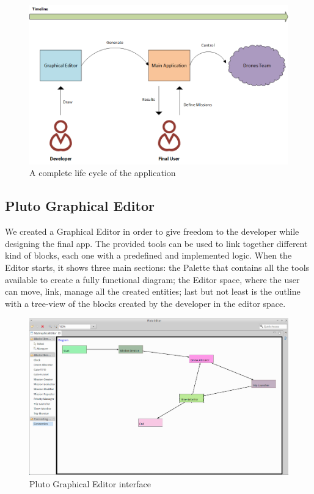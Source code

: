 \begin{figure}[htb]
  \centering
  \includegraphics[width=\linewidth]{pictures/lifeCycle.png}
  \caption{A complete life cycle of the application}
  \label{fig:lifeCycle}
\end{figure}

\subsection{Pluto Graphical Editor}
\label{plutoGraphicalEditor}

We created a Graphical Editor in order to give freedom to the developer while designing the final app. The provided tools can be used to link together different kind of blocks, each one with a predefined and implemented logic.
When the Editor starts, it shows three main sections: the Palette that contains all the tools available to create a fully functional diagram; the Editor space, where the user can move, link, manage all the created entities; last but not least is the outline with a tree-view of the blocks created by the developer in the editor space.

\begin{figure}[htb]
  \centering
  \includegraphics[width=\linewidth]{pictures/EditorScreen.png}
  \caption{Pluto Graphical Editor interface}
  \label{fig:GraphicalEditor}
\end{figure}

